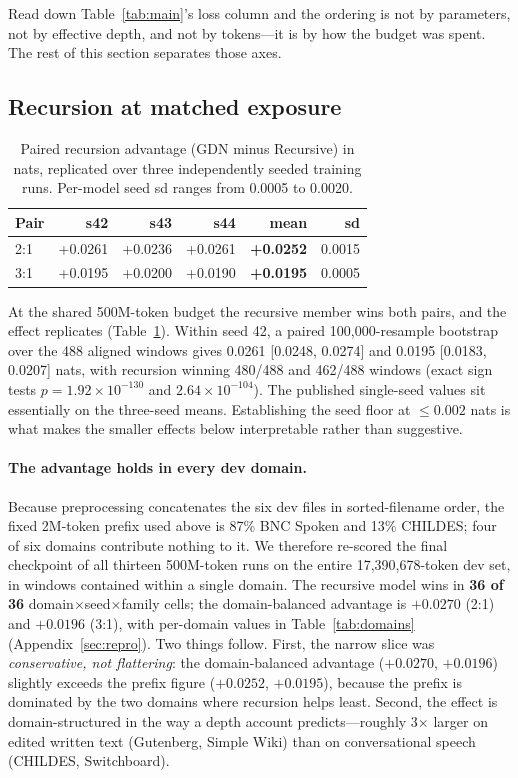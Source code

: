 \documentclass[11pt]{article}
\begin{document}
Read down Table~\ref{tab:main}'s loss column and the ordering is not by parameters, not by effective depth, and not by tokens---it is by how the budget was spent. The rest of this section separates those axes.

\subsection{Recursion at matched exposure}
\label{sec:exposure}

\begin{table}[t]
\centering
\footnotesize
\setlength{\tabcolsep}{4pt}
\begin{tabular}{lrrrrr}
\toprule
Pair & s42 & s43 & s44 & mean & sd \\
\midrule
2:1 & +0.0261 & +0.0236 & +0.0261 & \textbf{+0.0252} & 0.0015 \\
3:1 & +0.0195 & +0.0200 & +0.0190 & \textbf{+0.0195} & 0.0005 \\
\bottomrule
\end{tabular}
\caption{Paired recursion advantage (GDN minus Recursive) in nats, replicated over three independently seeded training runs. Per-model seed sd ranges from 0.0005 to 0.0020.}
\label{tab:seeds}
\end{table}

At the shared 500M-token budget the recursive member wins both pairs, and the effect replicates (Table~\ref{tab:seeds}). Within seed 42, a paired 100{,}000-resample bootstrap over the 488 aligned windows gives 0.0261 [0.0248, 0.0274] and 0.0195 [0.0183, 0.0207] nats, with recursion winning 480/488 and 462/488 windows (exact sign tests $p = 1.92\times10^{-130}$ and $2.64\times10^{-104}$). The published single-seed values sit essentially on the three-seed means. Establishing the seed floor at ${\leq}0.002$ nats is what makes the smaller effects below interpretable rather than suggestive.

\paragraph{The advantage holds in every dev domain.} Because preprocessing concatenates the six dev files in sorted-filename order, the fixed 2M-token prefix used above is 87\% BNC Spoken and 13\% CHILDES; four of six domains contribute nothing to it. We therefore re-scored the final checkpoint of all thirteen 500M-token runs on the entire 17{,}390{,}678-token dev set, in windows contained within a single domain. The recursive model wins in \textbf{36 of 36} domain$\times$seed$\times$family cells; the domain-balanced advantage is $+0.0270$ (2:1) and $+0.0196$ (3:1), with per-domain values in Table~\ref{tab:domains} (Appendix~\ref{sec:repro}). Two things follow. First, the narrow slice was \emph{conservative, not flattering}: the domain-balanced advantage ($+0.0270$, $+0.0196$) slightly exceeds the prefix figure ($+0.0252$, $+0.0195$), because the prefix is dominated by the two domains where recursion helps least. Second, the effect is domain-structured in the way a depth account predicts---roughly 3$\times$ larger on edited written text (Gutenberg, Simple Wiki) than on conversational speech (CHILDES, Switchboard).
\end{document}
